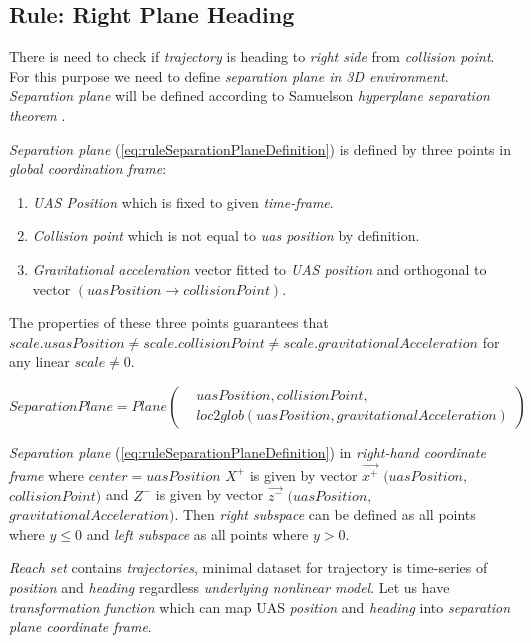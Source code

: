 \subsection{Rule: Right Plane Heading}\label{sec:ruleRightPlaneHeading}
\noindent There is need to check if \emph{trajectory} is heading to \emph{right side} from \emph{collision point}. For this purpose we need to define \emph{separation plane in 3D environment}. \emph{Separation plane} will be defined according to Samuelson \emph{hyperplane separation theorem} \cite{samelson1958partition}.

\emph{Separation plane} (\ref{eq:ruleSeparationPlaneDefinition}) is defined by three points in \emph{global coordination frame}:
\begin{enumerate}
    \item \emph{UAS Position} which is fixed to given \emph{time-frame}.
    \item \emph{Collision point} which is not equal to \emph{uas position} by definition.
    \item \emph{Gravitational acceleration} vector fitted to \emph{UAS position} and orthogonal to vector $(uasPosition\to collisionPoint)$.
\end{enumerate}
The properties of these three points guarantees that 
$scale.usasPosition\neq scale.collisionPoint \neq scale.gravitationalAcceleration$ for any linear $scale\neq0$.

\begin{equation}\label{eq:ruleSeparationPlaneDefinition}
    SeparationPlane=Plane\left(\begin{aligned}&uasPosition,collisionPoint,\\&loc2glob(uasPosition,gravitationalAcceleration)\end{aligned}\right)
\end{equation}

\noindent \emph{Separation plane} (\ref{eq:ruleSeparationPlaneDefinition}) in \emph{right-hand coordinate frame} where $center=uasPosition$ $X^+$ is given by vector $\vec{x^+}$ $(uasPosition,$ $collisionPoint)$  and $Z^-$ is given by vector $\vec{z^-}$  $(uasPosition,$ $gravitationalAcceleration)$. Then \emph{right subspace} can be defined as all points where $y\le0$ and \emph{left subspace} as all points where $y>0$.

\emph{Reach set} contains \emph{trajectories}, minimal dataset for trajectory is time-series of \emph{position} and \emph{heading} regardless \emph{underlying nonlinear model}. Let us have \emph{transformation function} which can map UAS \emph{position} and \emph{heading} into \emph{separation plane coordinate frame}. 

